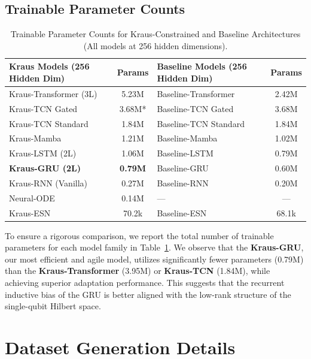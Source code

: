 \documentclass{article} %
\begin{document}
\subsection{Trainable Parameter Counts}


\begin{table}[h]
\centering
\caption{Trainable Parameter Counts for Kraus-Constrained and Baseline Architectures (All models at 256 hidden dimensions).}
\label{tab:param_counts}
\small
\begin{tabular}{lclc}
\toprule
\textbf{Kraus Models (256 Hidden Dim)} & \textbf{Params} & \textbf{Baseline Models (256 Hidden Dim)} & \textbf{Params} \\
\midrule
Kraus-Transformer (3L) & 5.23M          & Baseline-Transformer & 2.42M \\
Kraus-TCN Gated        & 3.68M*         & Baseline-TCN Gated    & 3.68M \\
Kraus-TCN Standard     & 1.84M          & Baseline-TCN Standard & 1.84M \\
Kraus-Mamba            & 1.21M          & Baseline-Mamba        & 1.02M\\
Kraus-LSTM (2L)        & 1.06M          & Baseline-LSTM         & 0.79M \\
\textbf{Kraus-GRU (2L)} & \textbf{0.79M} & Baseline-GRU          & 0.60M \\
Kraus-RNN (Vanilla)    & 0.27M          & Baseline-RNN          & 0.20M \\
Neural-ODE             & 0.14M          & ---                   & --- \\
Kraus-ESN              & 70.2k         & Baseline-ESN          & 68.1k \\
\bottomrule
\end{tabular}
\vfill

\end{table}
To ensure a rigorous comparison, we report the total number of trainable parameters for each model family in Table~\ref{tab:param_counts}. We observe that the \textbf{Kraus-GRU}, our most efficient and agile model, utilizes significantly fewer parameters (0.79M) than the \textbf{Kraus-Transformer} (3.95M) or \textbf{Kraus-TCN} (1.84M), while achieving superior adaptation performance. This suggests that the recurrent inductive bias of the GRU is better aligned with the low-rank structure of the single-qubit Hilbert space.
\section{Dataset Generation Details}
\label{app:dataset}
\end{document}
